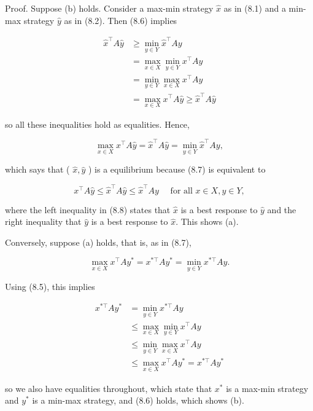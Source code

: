 \documentclass[12pt]{article}
\begin{document}
Proof. Suppose (b) holds. Consider a max-min strategy $\hat{x}$ as in (8.1) and a min-max strategy $\hat{y}$ as in (8.2). Then (8.6) implies

$$
\begin{aligned}
\hat{x}^{\top} A \hat{y} & \geq \min _{y \in Y} \hat{x}^{\top} A y \\
& =\max _{x \in X} \min _{y \in Y} x^{\top} A y \\
& =\min _{y \in Y} \max _{x \in X} x^{\top} A y \\
& =\max _{x \in X} x^{\top} A \hat{y} \geq \hat{x}^{\top} A \hat{y}
\end{aligned}
$$

so all these inequalities hold as equalities. Hence,


\begin{equation*}
\max _{x \in X} x^{\top} A \hat{y}=\hat{x}^{\top} A \hat{y}=\min _{y \in Y} \hat{x}^{\top} A y, \tag{8.7}
\end{equation*}


which says that ( $\hat{x}, \hat{y}$ ) is a equilibrium because (8.7) is equivalent to


\begin{equation*}
x^{\top} A \hat{y} \leq \hat{x}^{\top} A \hat{y} \leq \hat{x}^{\top} A y \quad \text { for all } x \in X, y \in Y, \tag{8.8}
\end{equation*}


where the left inequality in (8.8) states that $\hat{x}$ is a best response to $\hat{y}$ and the right inequality that $\hat{y}$ is a best response to $\hat{x}$. This shows (a).

Conversely, suppose (a) holds, that is, as in (8.7),

$$
\max _{x \in X} x^{\top} A y^{*}=x^{* \top} A y^{*}=\min _{y \in Y} x^{* \top} A y .
$$

Using (8.5), this implies

$$
\begin{aligned}
x^{* \top} A y^{*} & =\min _{y \in Y} x^{* \top} A y \\
& \leq \max _{x \in X} \min _{y \in Y} x^{\top} A y \\
& \leq \min _{y \in Y} \max _{x \in X} x^{\top} A y \\
& \leq \max _{x \in X} x^{\top} A y^{*}=x^{* \top} A y^{*}
\end{aligned}
$$

so we also have equalities throughout, which state that $x^{*}$ is a max-min strategy and $y^{*}$ is a min-max strategy, and (8.6) holds, which shows (b).
\end{document}
